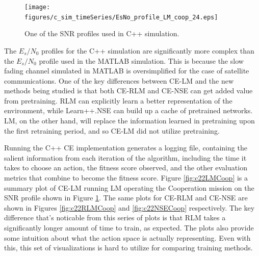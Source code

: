 \begin{figure}[ht]
\centering
\texttt{[image: figures/c\_sim\_timeSeries/EsNo\_profile\_LM\_coop\_24.eps]}
\caption{One of the SNR profiles used in C++ simulation.}
\label{fig:cSimSNRProfile}
\end{figure}
\FloatBarrier
\par The $E_s/N_0$ profiles for the C++ simulation are significantly more complex than the $E_s/N_0$ profile used in the MATLAB simulation. This is because the slow fading channel simulated in MATLAB is oversimplified for the case of satellite communications. One of the key differences between CE-LM and the new methods being studied is that both CE-RLM and CE-NSE can get added value from pretraining. RLM can explicitly learn a better representation of the environment, while Learn++.NSE can build up a cache of pretrained networks. LM, on the other hand, will replace the information learned in pretraining upon the first retraining period, and so CE-LM did not utilize pretraining. 
\par Running the C++ CE implementation generates a logging file, containing the salient information from each iteration of the algorithm, including the time it takes to choose an action, the fitness score observed, and the other evaluation metrics that combine to become the fitness score. Figure \ref{fig:c22LMCoop} is a summary plot of CE-LM running LM operating the Cooperation mission on the SNR profile shown in Figure \ref{fig:cSimSNRProfile}. The same plots for CE-RLM and CE-NSE are shown in Figures \ref{fig:c22RLMCoop} and \ref{fig:c22NSECoop} respectively. The key difference that's noticable from this series of plots is that RLM takes a significantly longer amount of time to train, as expected. The plots also provide some intuition about what the action space is actually representing. Even with this, this set of visualizations is hard to utilize for comparing training methods.
